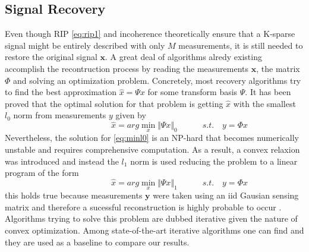 \subsection{Signal Recovery}
Even though RIP \ref{eq:rip1} and incoherence theoretically ensure that a K-sparse signal might be entirely described with only $M$ measurements, it is still needed to restore the original signal $\mathbf{x}$. A great deal of algorithms alredy existing accomplish the recontruction process by reading the measurements $\mathbf{x}$, the matrix  $\Phi$ and solving an optimization problem. Concretely, most recovery algorithms try to find the best approximation $\hat{x} = \Psi x$ for some transform basis $\Psi$. It has been proved \cite{candes2006near,Donoho01} that the optimal solution for that problem is getting $\hat{x}$ with the smallest $l_0$ norm from measurements $y$ given by         
\begin{equation} \label{eq:minl0}
\hspace{3em} \hspace{3em} \hspace{3em} \hat{x} = arg \min_{x} \Vert \Psi x \Vert_0 \hspace{3em} s.t. \enspace \enspace y = \Phi x     \hspace{3em}
\end{equation}     
Nevertheless, the solution for \ref{eq:minl0} is an NP-hard that becomes numerically unstable and requires comprehensive computation. As a result, a convex relaxion was introduced and instead the $l_1$ norm is used reducing the problem to a linear program  of the form 
\begin{equation} \label{eq:minl1}
\hspace{3em} \hspace{3em} \hspace{3em} \hat{x} = arg \min_{x} \Vert \Psi x \Vert_1 \hspace{3em} s.t. \enspace \enspace y = \Phi x     \hspace{3em}
\end{equation}
this holds true because measurements $\mathbf{y}$ were taken using an iid Gausian sensing matrix and therefore a sucessful reconstruction is highly probable to occur \cite{Donoho01,candes2006robust}. Algorithms trying to solve this problem are dubbed iterative given the nature of convex optimization. Among state-of-the-art iterative algorithms one can find \cite{dong2014compressive,li2013efficient,metzler2014denoising} and they are used as a baseline to compare our results.  \

